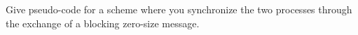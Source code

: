   Give pseudo-code for a scheme where you synchronize the two
  processes through the exchange of a blocking zero-size message.
